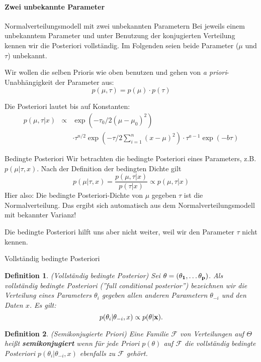 \documentclass[german]{beamer}
\newtheorem{Def}{Definition}
\numberwithin{Bsp}{section}
\numberwithin{Def}{section}
\numberwithin{Stz}{section}
\begin{document}
\paragraph{Zwei unbekannte Parameter}
\begin{frame}{Normalverteilungsmodell mit zwei unbekannten Parametern}
Bei jeweils einem unbekanntem Parameter und unter Benutzung der konjugierten Verteilung kennen wir die Posteriori vollständig. Im Folgenden seien beide Parameter ($\mu$ und $\tau$) unbekannt.

Wir wollen die selben Prioris wie oben benutzen und gehen von \textit{a priori}-Unabhängigkeit der Parameter aus:
$$ p(\mu,\tau)=p(\mu)\cdot p(\tau) $$

Die Posteriori lautet bis auf Konstanten:
\begin{eqnarray*}
p(\mu,\tau|x)&\propto& \exp\left(-\tau_0/2 (\mu-\mu_0)^2\right)\\
&&\cdot\tau^{n/2}\exp\left(-\tau/2\sum_{i=1}^n(x-\mu)^2\right)\cdot\tau^{a-1}\exp(-b\tau)
\end{eqnarray*}
\end{frame}


\begin{frame}{Bedingte Posteriori}
Wir betrachten die bedingte Posteriori eines Parameters, z.B. $p(\mu|\tau,x)$. Nach der Definition der bedingten Dichte gilt
\[
p(\mu|\tau,x)=\frac{p(\mu,\tau|x)}{p(\tau|x)}\propto p(\mu,\tau|x)
\]
Hier also: Die bedingte Posteriori-Dichte von $\mu$ gegeben $\tau$ ist die Normalverteilung. Das ergibt sich automatisch aus dem Normalverteilungsmodell mit bekannter Varianz!

Die bedingte Posteriori hilft uns aber nicht weiter, weil wir den Parameter $\tau$ nicht kennen.
\end{frame}

\begin{frame}{Vollständig bedingte Posteriori}
\begin{Def}(Vollständig bedingte Posterior)
Sei $\bf{\theta}=(\theta_1,\ldots\theta_p)$. Als vollständig bedingte Posteriori (''full conditional posterior'') bezeichnen wir die Verteilung eines Parameters $\theta_i$ gegeben allen anderen Parametern $\theta_{-i}$ und den Daten $x$. Es gilt:
$$
 p(\theta_i|\theta_{-i},x)\propto p(\bf{\theta}|x).
$$
\end{Def}

\begin{Def}(Semikonjugierte Priori)
Eine Familie $\mathcal{F}$ von Verteilungen auf $\Theta$ heißt \textbf{semikonjugiert} wenn für jede Priori $p(\theta)$ auf $\mathcal{F}$ die vollständig bedingte Posteriori $p(\theta_i|\theta_{-i},x)$ ebenfalls zu $\mathcal{F}$ gehört. 
\end{Def}
\end{frame}
\end{document}
